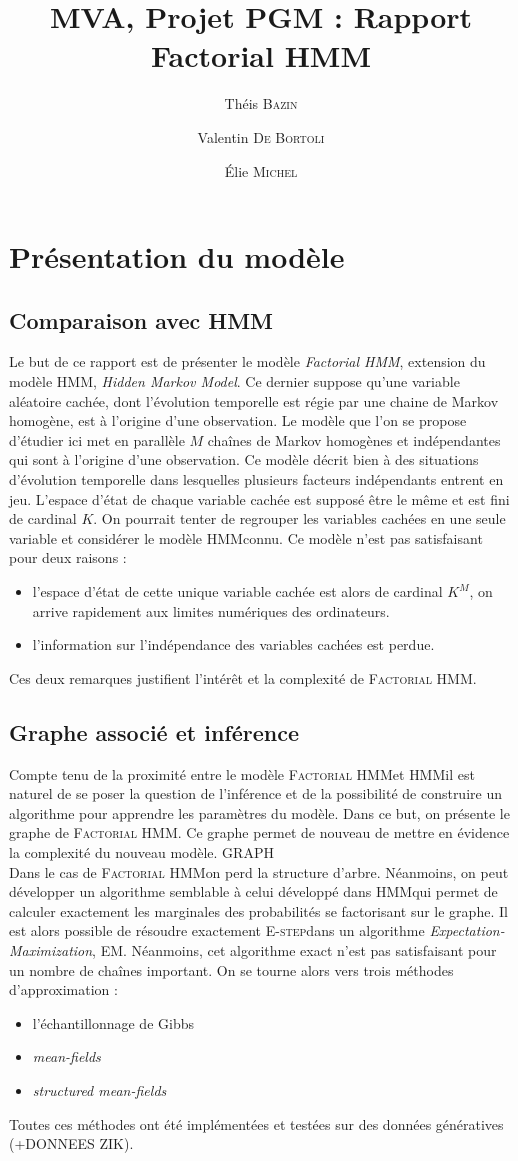 \documentclass[10pt,a4paper]{article}
\title{MVA, Projet PGM : Rapport\\
  Factorial HMM}
\author{Théis \textsc{Bazin} \and Valentin \textsc{De Bortoli} \and Élie \textsc{Michel}}
\newcommand{\hmm}{\textsc{HMM}}
\newcommand{\fhmm}{\textsc{Factorial HMM}}
\newcommand{\Estep}{\textsc{E-step}}
\newcommand{\EM}{\textsc{EM}}
\begin{document}
\maketitle

\section{Présentation du modèle}
\subsection{Comparaison avec HMM}
Le but de ce rapport est de présenter le modèle \emph{Factorial HMM}, extension du modèle \hmm, \emph{Hidden Markov Model}. Ce dernier suppose qu'une variable aléatoire cachée, dont l'évolution temporelle est régie par une chaine de Markov homogène, est à l'origine d'une observation. Le modèle que l'on se propose d'étudier ici met en parallèle $M$ chaînes de Markov homogènes et indépendantes qui sont à l'origine d'une observation. Ce modèle décrit bien à des situations d'évolution temporelle dans lesquelles plusieurs facteurs indépendants entrent en jeu. L'espace d'état de chaque variable cachée est supposé être le même et est fini de cardinal $K$. On pourrait tenter de regrouper les variables cachées en une seule variable et considérer le modèle \hmm connu. Ce modèle n'est pas satisfaisant pour deux raisons :
\begin{itemize}
\item l'espace d'état de cette unique variable cachée est alors de cardinal $K^M$, on arrive rapidement aux limites numériques des ordinateurs.
\item l'information sur l'indépendance des variables cachées est perdue.
\end{itemize}
Ces deux remarques justifient l'intérêt et la complexité de \fhmm.
\subsection{Graphe associé et inférence} 
Compte tenu de la proximité entre le modèle \fhmm et \hmm il est naturel de se poser la question de l'inférence et de la possibilité de construire un algorithme pour apprendre les paramètres du modèle. Dans ce but, on présente le graphe de \fhmm. Ce graphe permet de nouveau de mettre en évidence la complexité du nouveau modèle.
GRAPH\\
Dans le cas de \fhmm on perd la structure d'arbre. Néanmoins, on peut développer un algorithme semblable à celui développé dans \hmm qui permet de calculer exactement les marginales des probabilités se factorisant sur le graphe. Il est alors possible de résoudre exactement \Estep dans un algorithme \emph{Expectation-Maximization}, \EM. Néanmoins, cet algorithme exact n'est pas satisfaisant pour un nombre de chaînes important. On se tourne alors vers trois méthodes d'approximation :
\begin{itemize}
\item l'échantillonnage de Gibbs
\item \textit{mean-fields}
\item \textit{structured mean-fields}
\end{itemize}
Toutes ces méthodes ont été implémentées et testées sur des données génératives (+DONNEES ZIK).
\end{document}
